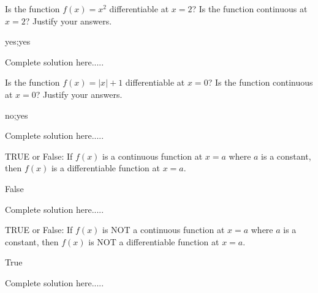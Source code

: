 \vspace{-0.6cm}
\begin{example}
Is the function $f(x)=x^2$ differentiable at $x=2$?  Is the function continuous at $x=2$? Justify your answers.
    \begin{sol}
    yes;yes
    \end{sol}
    \begin{solL}
    Complete solution here.....
    
    \end{solL}
    
\end{example}
\vspace{0.5in}
\begin{example}
Is the function $f(x)=|x|+1$ differentiable at $x=0$?  Is the function continuous at $x=0$? Justify your answers.
    \begin{sol}
    no;yes
    \end{sol}
    \begin{solL}
    Complete solution here.....
    
    \end{solL}
    
\end{example}
\vspace{0.5in}
\newpage
\begin{example}
TRUE or False: If $f(x)$ is a continuous function at $x=a$ where $a$ is a constant, then $f(x)$ is a differentiable function at $x=a$.
    \begin{sol}
    False
    \end{sol}
    \begin{solL}
    Complete solution here.....
    
    \end{solL}
    
\end{example}
\begin{example}
TRUE or False: If $f(x)$ is NOT a continuous function at $x=a$ where $a$ is a constant, then $f(x)$ is NOT a differentiable function at $x=a$.
    \begin{sol}
    True
    \end{sol}
    \begin{solL}
    Complete solution here.....
    
    \end{solL}
    
\end{example}
